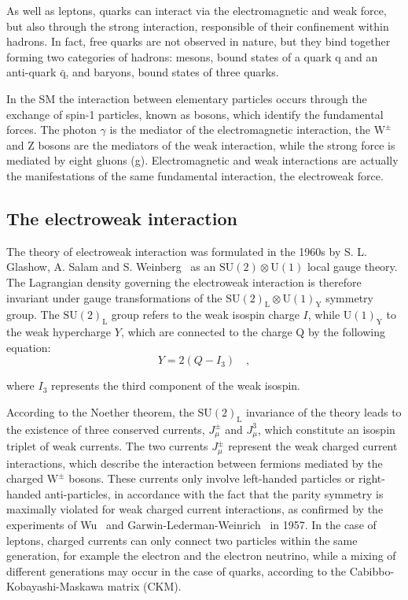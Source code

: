 As well as leptons, quarks can interact via the electromagnetic and weak force, but also through the strong interaction, responsible of their confinement within hadrons. In fact, free quarks are not observed in nature, but they bind together forming two categories of hadrons: mesons, bound states of a quark q and an anti-quark $\mathrm{\bar{q}}$, and baryons, bound states of three quarks.

In the SM the interaction between elementary particles occurs through the exchange of spin-1 particles, known as bosons, which identify the fundamental forces. The photon $\gamma$ is the mediator of the electromagnetic interaction, the $\mathrm{W^{\pm}}$ and Z bosons are the mediators of the weak interaction, while the strong force is mediated by eight gluons (g). Electromagnetic and weak interactions are actually the manifestations of the same fundamental interaction, the electroweak force.


\subsection{The electroweak interaction}

The theory of electroweak interaction was formulated in the 1960s by S. L. Glashow, A. Salam and S. Weinberg~\cite{Glashow:1961tr,Weinberg:1967tq} as an $\mathrm{SU(2) \otimes U(1)}$ local gauge theory.
The Lagrangian density governing the electroweak interaction is therefore invariant under gauge transformations of the $\mathrm{SU(2)_L\otimes U(1)_Y}$ symmetry group. The $\mathrm{SU(2)_L}$ group refers to the weak isospin charge $I$, while $\mathrm{U(1)_Y}$ to the weak hypercharge $Y$, which are connected to the charge Q by the following equation:
\begin{equation}
Y = 2(Q - I_3) \quad,
\end{equation}

\noindent where $I_3$ represents the third component of the weak isospin. 

According to the Noether theorem, the $\mathrm{SU(2)_L}$ invariance of the theory leads to the existence of three conserved currents, $J_\mu^\pm$ and $J_\mu^3$, which constitute an isospin triplet of weak currents. 
The two currents $J_\mu^\pm$ represent the weak charged current interactions, which describe the interaction between fermions mediated by the charged $\mathrm{W^\pm}$ bosons. These currents only involve left-handed particles or right-handed anti-particles, in accordance with the fact that the parity symmetry is maximally violated for weak charged current interactions, as confirmed by the experiments of Wu~\cite{Wu:1957my} and Garwin-Lederman-Weinrich~\cite{Garwin:1957hc} in 1957. In the case of leptons, charged currents can only connect two particles within the same generation, for example the electron and the electron neutrino, while a mixing of different generations may occur in the case of quarks, according to the Cabibbo-Kobayashi-Maskawa matrix (CKM).

